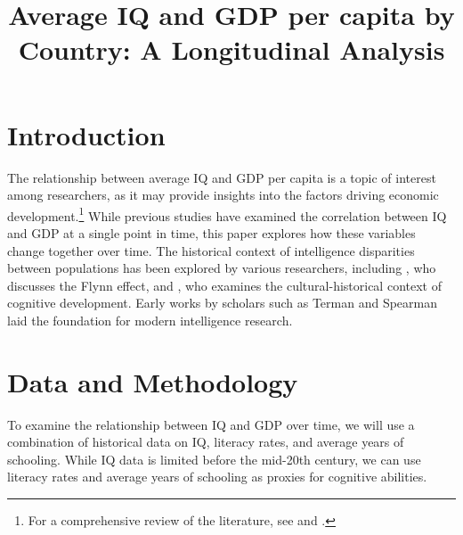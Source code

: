 \documentclass{article}
\begin{document}
\title{Average IQ and GDP per capita by Country: A Longitudinal Analysis}
\author{}
\date{}
\maketitle

\section{Introduction}

The relationship between average IQ and GDP per capita is a topic of interest among researchers, as it may provide insights into the factors driving economic development.\footnote{For a comprehensive review of the literature, see \cite{LynnVanhanen2012} and \cite{Rindermann2018}.} While previous studies have examined the correlation between IQ and GDP at a single point in time, this paper explores how these variables change together over time. The historical context of intelligence disparities between populations has been explored by various researchers, including \cite{flynn2012are}, who discusses the Flynn effect, and \cite{cole1995cultural}, who examines the cultural-historical context of cognitive development. Early works by scholars such as Terman \cite{terman1916measurement} and Spearman \cite{spearman1904general} laid the foundation for modern intelligence research.

\section{Data and Methodology}

To examine the relationship between IQ and GDP over time, we will use a combination of historical data on IQ, literacy rates, and average years of schooling. While IQ data is limited before the mid-20th century, we can use literacy rates and average years of schooling as proxies for cognitive abilities.
\end{document}
